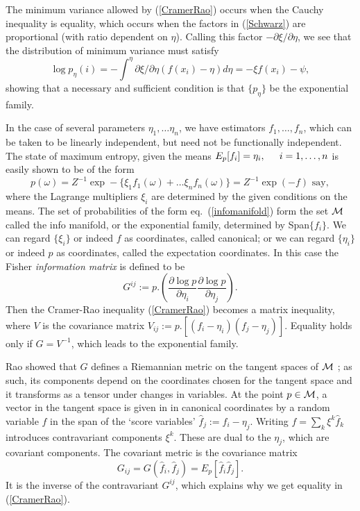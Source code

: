 \documentclass[12pt]{article}
\begin{document}
The minimum variance allowed by (\ref{CramerRao}) occurs when the Cauchy
inequality is equality, which occurs when the factors in (\ref{Schwarz})
are proportional (with ratio dependent on $\eta$). Calling this factor
$-\partial\xi/\partial\eta$, we see that the distribution of minimum
variance must satisfy
\begin{equation}
\log p_\eta(i)=-\int^\eta \partial\xi/\partial\eta(f(x_i)-\eta)d\eta=
-\xi f(x_i)-\psi,
\end{equation}
showing that a necessary and sufficient condition is that $\{p_\eta\}$ be the
exponential family.




In the case of several parameters $\eta_1,\ldots\eta_n$, we have
estimators $f_1,\ldots,f_n$, which can
be taken to be linearly independent, but need not be functionally
independent. The state of maximum entropy, given the means $E_p[f_i]=\eta_i,
\hspace{.2in}i=1,\ldots,n$ is easily shown to be of the form
\begin{equation}
p(\omega)=Z^{-1}\exp-\{\xi_1f_1(\omega)+\ldots\xi_nf_n(\omega)\}=Z^{-1}\exp
(-f)\mbox{ say},
\label{infomanifold}
\end{equation}
where the Lagrange multipliers $\xi_i$ are determined by the given conditions
on the means. The set of probabilities of the form
eq.~(\ref{infomanifold}) form the set ${\cal M}$
called the info manifold, or the exponential family, determined by
Span$\{f_i\}$. We can regard $\{\xi_i\}$ or indeed $f$ as coordinates,
called canonical; or we can regard $\{\eta_i\}$ or indeed $p$ as coordinates,
called the expectation coordinates. In this case the Fisher {\em information
matrix} is defined to be
\begin{equation}
G^{ij}:=p.\left(\frac{\partial \log p}{\partial\eta_i}\frac{\partial\log p}{
\partial\eta_j}\right).
\end{equation}
Then the Cramer-Rao inequality (\ref{CramerRao}) becomes a matrix inequality,
where $V$ is the covariance matrix $V_{ij}:=p.[(f_i-\eta_i)(f_j-\eta_j)]$.
Equality holds only if $G=V^{-1}$, which leads to the exponential family. 

Rao showed that $G$  defines a Riemannian metric on
the tangent spaces of ${\cal M}$ \cite{Ingarden2}; as such, its components
depend on the coordinates chosen for the tangent space and it transforms
as a tensor under changes in variables.
At the point $p\in{\cal M}$, a vector in the tangent space is given in
in canonical coordinates by a random
variable $f$ in the span of the `score variables' $\hat{f}_j:=f_i-\eta_j$.
Writing $f=\sum_k\xi^k\hat{f}_k$ introduces contravariant components $\xi^k$.
These are dual to the $\eta_j$, which are covariant components.
The covariant metric is the covariance matrix
\begin{equation}
G_{ij}=G(\hat{f}_i,\hat{f}_j)=E_p[\hat{f}_i\hat{f}_j].
\end{equation}
It is the inverse of the contravariant $G^{ij}$, which explains why we get
equality in (\ref{CramerRao}).
\end{document}
